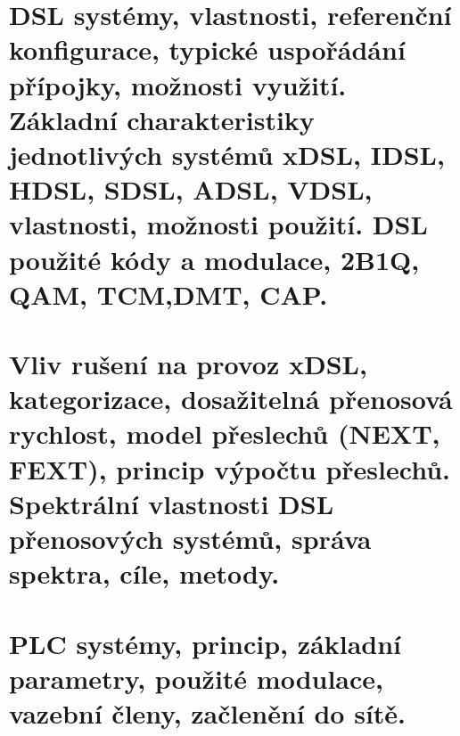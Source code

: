 \clearpage
\section{DSL systémy, vlastnosti, referenční konfigurace, typické uspořádání přípojky, možnosti využití. Základní charakteristiky jednotlivých systémů xDSL, IDSL, HDSL, SDSL, ADSL, VDSL, vlastnosti, možnosti použití. DSL použité kódy a modulace, 2B1Q, QAM, TCM,DMT, CAP.}

\clearpage
\section{Vliv rušení na provoz xDSL, kategorizace, dosažitelná přenosová rychlost, model přeslechů (NEXT, FEXT), princip výpočtu přeslechů. Spektrální vlastnosti DSL přenosových systémů, správa spektra, cíle, metody.}

\clearpage
\section{PLC systémy, princip, základní parametry, použité modulace, vazební členy, začlenění do sítě.}
